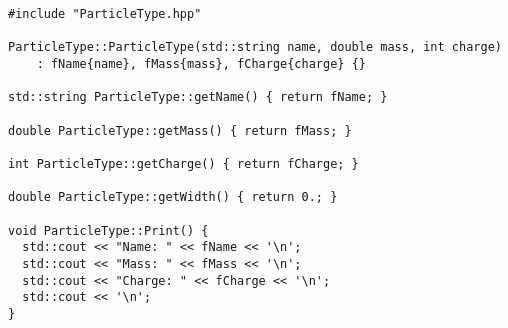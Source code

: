 \begin{lstlisting}
#include "ParticleType.hpp"

ParticleType::ParticleType(std::string name, double mass, int charge)
    : fName{name}, fMass{mass}, fCharge{charge} {}

std::string ParticleType::getName() { return fName; }

double ParticleType::getMass() { return fMass; }

int ParticleType::getCharge() { return fCharge; }

double ParticleType::getWidth() { return 0.; }

void ParticleType::Print() {
  std::cout << "Name: " << fName << '\n';
  std::cout << "Mass: " << fMass << '\n';
  std::cout << "Charge: " << fCharge << '\n';
  std::cout << '\n';
}
\end{lstlisting}